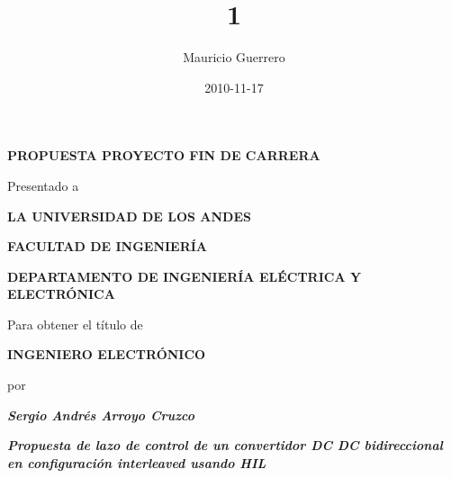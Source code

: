 \documentclass[letterpaper]{article}
\title{1}
\author{Mauricio Guerrero}
\date{2010-11-17}
\begin{document}
\clearpage
\pagestyle{Standard}
\thispagestyle{FirstPage}
\setcounter{page}{1}
{
\foreignlanguage{spanish}


\bigskip


\bigskip

{\centering{}
\foreignlanguage{spanish}{\textbf{PROPUESTA PROYECTO FIN DE CARRERA}}
\par}


\bigskip

{\centering{}
\foreignlanguage{spanish}{Presentado a}
\par}


\bigskip

{\centering{}
\foreignlanguage{spanish}{\textbf{LA UNIVERSIDAD DE LOS ANDES}}
\par}

{\centering{}
\foreignlanguage{spanish}{\textbf{FACULTAD DE INGENIERÍA}}
\par}

{\centering{}
\foreignlanguage{spanish}{\textbf{DEPARTAMENTO DE INGENIERÍA ELÉCTRICA Y ELECTRÓNICA}}
\par}


\bigskip


\bigskip


\bigskip

{\centering{}
\foreignlanguage{spanish}{Para obtener el título de}
\par}


\bigskip

{\centering{}
\foreignlanguage{spanish}{\textbf{INGENIERO ELECTRÓNICO}}
\par}


\bigskip


\bigskip

{\centering{}
\foreignlanguage{spanish}{por }
\par}


\bigskip

{\centering{}
\foreignlanguage{spanish}{\textbf{\textit{Sergio Andrés Arroyo Cruzco}}}
\par}


\bigskip


\bigskip


\bigskip


\bigskip

{\centering{}
\foreignlanguage{spanish}{\textbf{\textit{Propuesta de lazo de control de un convertidor DC DC bidireccional en configuración interleaved usando HIL}}}
\par}


}
\end{document}
